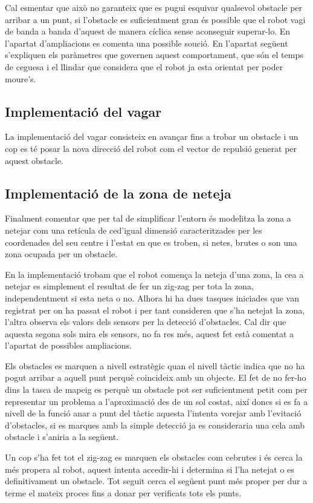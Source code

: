 Cal esmentar que això no garanteix que es pugui esquivar qualsevol obstacle per arribar a un punt, 
si l'obstacle es suficientment gran és possible que el robot vagi de banda a banda d'aquest de manera
cíclica sense aconseguir superar-lo. En l'apartat d'ampliacions es comenta una possible so\lgem ució. En
l'apartat següent s'expliquen els paràmetres que governen aquest comportament, que són el temps
de ceguesa i el llindar que considera que el robot ja esta orientat per poder moure's.

\subsection{Implementació del vagar}

La implementació del vagar consisteix en avançar fins a trobar un obstacle i un cop es té posar 
la nova direcció del robot com el vector de repulsió generat per aquest obstacle.

\subsection{Implementació de la zona de neteja}

Finalment comentar que per tal de simplificar l'entorn és modelitza la zona a netejar com una retícula
de ce\lgem d'igual dimensió caracteritzades per les coordenades del seu centre i l'estat en que es troben,
si netes, brutes o son una zona ocupada per un obstacle.

En la implementació trobam que el robot comença la neteja d'una zona, la ce\lgem a a netejar es simplement
el resultat de fer un zig-zag per tota la zona, independentment si esta neta o no. Alhora hi ha dues tasques
iniciades que van registrat per on ha passat el robot i per tant consideren que s'ha netejat la zona, l'altra
observa els valors dels sensors per la detecció d'obstacles. Cal dir que aquesta segona sols mira els sensors,
no fa res més, aquest fet està comentat a l'apartat de possibles ampliacions.

Els obstacles es marquen a nivell estratègic quan el nivell tàctic indica que no ha pogut arribar a aquell
punt perquè coincideix amb un objecte. El fet de no fer-ho dins la tasca de mapeig es perquè un obstacle
pot ser suficientment petit com per representar un problema a l'aproximació des de un sol costat, així doncs
si es fa a nivell de la funció anar a punt del tàctic aquesta l'intenta vorejar amb l'evitació d'obstacles, si
es marques amb la simple detecció ja es consideraria una cela amb obstacle i s'aniria a la següent.

Un cop s'ha fet tot el zig-zag es marquen els obstacles com ce\lgem brutes \cite{neteja} i és cerca la més
propera al robot, aquest intenta accedir-hi i determina si l'ha netejat o es definitivament un
obstacle\cite{netejaobs}. Tot seguit cerca el següent punt més proper per dur a terme el mateix proces fins a donar per verificats tots els punts.

 